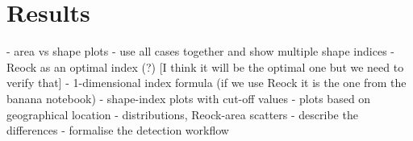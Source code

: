 \section{Results}
\label{sec:results}

- area vs shape plots
    - use all cases together and show multiple shape indices
- Reock as an optimal index (?) [I think it will be the optimal one but we need to verify that]
- 1-dimensional index formula (if we use Reock it is the one from the banana notebook)
- shape-index plots with cut-off values
- plots based on geographical location
    - distributions, Reock-area scatters
    - describe the differences
- formalise the detection workflow
